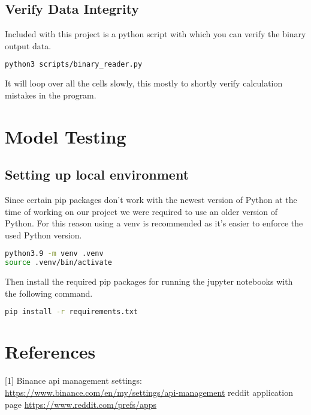 \documentclass[12pt,a4paper]{article}
\begin{document}
\subsection{Verify Data Integrity}

Included with this project is a python script with which you can verify the binary output data.

\begin{lstlisting}[language=bash]
python3 scripts/binary_reader.py
\end{lstlisting}

It will loop over all the cells slowly, this mostly to shortly verify calculation mistakes in the program.

\section{Model Testing}

\subsection{Setting up local environment}

Since certain pip packages don't work with the newest version of Python at the time of working on our project we were required to use an older version of Python. For this reason using a venv is recommended as it's easier to enforce the used Python version.

\begin{lstlisting}[language=bash]
python3.9 -m venv .venv
source .venv/bin/activate
\end{lstlisting}

Then install the required pip packages for running the jupyter notebooks with the following command.

\begin{lstlisting}[language=bash]
pip install -r requirements.txt
\end{lstlisting}

\section{References}
[1] Binance api management settings: \newline \href{https://www.binance.com/en/my/settings/api-management}{https://www.binance.com/en/my/settings/api-management}
\newline
[2] reddit application page \href{https://www.reddit.com/prefs/apps}{https://www.reddit.com/prefs/apps}
\end{document}

